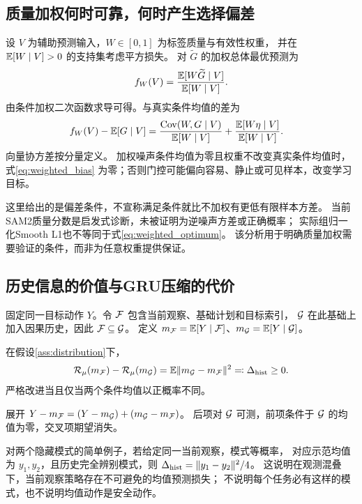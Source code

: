 \subsection{质量加权何时可靠，何时产生选择偏差}

设 $V$ 为辅助预测输入，$W\in[0,1]$ 为标签质量与有效性权重，
并在 $\mathbb{E}[W\mid V]>0$ 的支持集考虑平方损失。
对 $\widetilde G$ 的加权总体最优预测为
\begin{equation}
 f_W(V)=\frac{\mathbb{E}[W\widetilde G\mid V]}{\mathbb{E}[W\mid V]}.
 \label{eq:weighted_optimum}
\end{equation}
由条件加权二次函数求导可得。与真实条件均值的差为
\begin{align}
 f_W(V)-\mathbb{E}[G\mid V]
 ={}&\frac{\operatorname{Cov}(W,G\mid V)}{\mathbb{E}[W\mid V]}
       +\frac{\mathbb{E}[W\eta\mid V]}{\mathbb{E}[W\mid V]}.
 \label{eq:weighted_bias}
\end{align}
向量协方差按分量定义。
加权噪声条件均值为零且权重不改变真实条件均值时，式\eqref{eq:weighted_bias}
为零；否则门控可能偏向容易、静止或可见样本，改变学习目标。

这里给出的是偏差条件，不宣称满足条件就比不加权有更低有限样本方差。
当前SAM2质量分数是启发式诊断，未被证明为逆噪声方差或正确概率；
实际组归一化Smooth L1也不等同于式\eqref{eq:weighted_optimum}。
该分析用于明确质量加权需要验证的条件，而非为任意权重提供保证。

\subsection{历史信息的价值与GRU压缩的代价}

固定同一目标动作 $Y$。令 $\mathcal{F}$ 包含当前观察、基础计划和目标索引，
$\mathcal{G}$ 在此基础上加入因果历史，因此 $\mathcal{F}\subseteq\mathcal{G}$。
定义 $m_{\mathcal{F}}=\mathbb{E}[Y\mid\mathcal{F}]$、$m_{\mathcal{G}}=\mathbb{E}[Y\mid\mathcal{G}]$。

\begin{proposition}[历史的最优风险收益]
\label{prop:history}
在假设\ref{ass:distribution}下，
\begin{equation}
 \mathcal R_\mu(m_{\mathcal{F}})-\mathcal R_\mu(m_{\mathcal{G}})
 =\mathbb{E}\lVert m_{\mathcal{G}}-m_{\mathcal{F}}\rVert^2\eqqcolon\Delta_{\mathrm{hist}}\geq0.
 \label{eq:history}
\end{equation}
严格改进当且仅当两个条件均值以正概率不同。
\end{proposition}
\begin{IEEEproof}
展开 $Y-m_{\mathcal{F}}=(Y-m_{\mathcal{G}})+(m_{\mathcal{G}}-m_{\mathcal{F}})$。
后项对 $\mathcal{G}$ 可测，前项条件于 $\mathcal{G}$ 的均值为零，交叉项期望消失。
\end{IEEEproof}

对两个隐藏模式的简单例子，若给定同一当前观察，模式等概率，
对应示范均值为 $y_1,y_2$，且历史完全辨别模式，则
$\Delta_{\mathrm{hist}}=\lVert y_1-y_2\rVert^2/4$。
这说明在观测混叠下，当前观察策略存在不可避免的均值预测损失；
不说明每个任务必有这样的模式，也不说明均值动作是安全动作。

